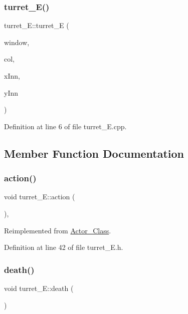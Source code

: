 \subsubsection{\texorpdfstring{turret\+\_\+\+E()}{turret\_E()}}
{\footnotesize\ttfamily turret\+\_\+\+E\+::turret\+\_\+E (\begin{DoxyParamCaption}\item[{sf\+::\+Render\+Window \&}]{window,  }\item[{\hyperlink{class_collision}{Collision}}]{col,  }\item[{int}]{x\+Inn,  }\item[{int}]{y\+Inn }\end{DoxyParamCaption})}



Definition at line 6 of file turret\+\_\+\+E.\+cpp.



\subsection{Member Function Documentation}
\hypertarget{classturret___e_ae171d53d23f25be7b0e76360803b2cf4}{}\label{classturret___e_ae171d53d23f25be7b0e76360803b2cf4} 
\subsubsection{\texorpdfstring{action()}{action()}}
{\footnotesize\ttfamily void turret\+\_\+\+E\+::action (\begin{DoxyParamCaption}{ }\end{DoxyParamCaption})\hspace{0.3cm}{\ttfamily [inline]}, {\ttfamily [virtual]}}



Reimplemented from \hyperlink{class_actor___class_ab8e23ffae108da3b8eda67c6753bdae0}{Actor\+\_\+\+Class}.



Definition at line 42 of file turret\+\_\+\+E.\+h.

\hypertarget{classturret___e_a7a5f3abce3a117af243be16265f84c6c}{}\label{classturret___e_a7a5f3abce3a117af243be16265f84c6c} 
\subsubsection{\texorpdfstring{death()}{death()}}
{\footnotesize\ttfamily void turret\+\_\+\+E\+::death (\begin{DoxyParamCaption}{ }\end{DoxyParamCaption})\hspace{0.3cm}{\ttfamily [virtual]}}



